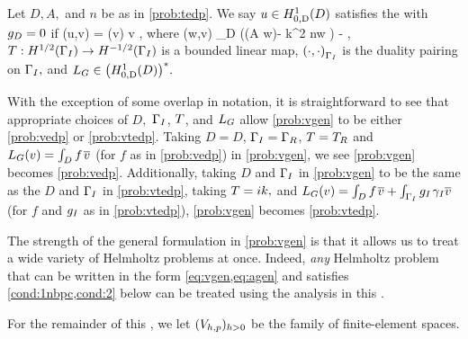\label{prob:vgen}
Let $D, A,$ and $n$ be as in \cref{prob:tedp}. We say $u \in \HozDD$ satisfies the  with $g_{D} = 0$ if
\beq\label{eq:vgen}
\aG(u,v) = \LG(v) \tfa v \in \HozDD,
\eeq
where
\beq\label{eq:agen}
\aG(w,v) \de \int_{D} \mleft(\mleft(A \grad w\mright)\cdot\grad \vbar - k^2 n\minispace w \vbar\mright) - ,
\eeq
$\T:\HhGI\rightarrow \HmhGI$ is a bounded linear map,  $\DPGI{\cdot}{\cdot}$ is the duality pairing on $\Gamma_{I},$ and $\LG  \in \HozDDs.$
\eprob

With the exception of some overlap in notation, it is straightforward to see that appropriate choices of $D,$ $\Gamma_{I}$, $T$, and $L_{G}$ allow \cref{prob:vgen} to be either \cref{prob:vedp} or \cref{prob:vtedp}. Taking $D = D$, $\Gamma_{I} = \Gamma_{R}$, $T = T_{R}$ and $L_{G}(v) = \int_{D} f\;\!\overline{v}$ (for $f$ as in \cref{prob:vedp}) in \cref{prob:vgen}, we see \cref{prob:vgen} becomes \cref{prob:vedp}. Additionally, taking $D$ and $\Gamma_{I}$ in \cref{prob:vgen} to be the same as the $D$ and $\Gamma_{I}$ in \cref{prob:vtedp}, taking $T=ik,$ and $L_{G}(v) = \int_{D} f\;\!\overline{v} + \int_{\Gamma_{I}} g_{I} \;\!\gamma_{I} \overline{v}$ (for $f$ and $g_{I}$ as in \cref{prob:vtedp}), \cref{prob:vgen} becomes \cref{prob:vtedp}.
\ere

The strength of the general formulation in \cref{prob:vgen} is that it allows us to treat a wide variety of Helmholtz problems at once. Indeed, \emph{any} Helmholtz problem that can be written in the form \cref{eq:vgen,eq:agen} and satisfies \cref{cond:1nbpc,cond:2} below can be treated using the analysis in this .
\ere 

For the remainder of this , we let $(V_{h,p})_{h>0}$ be the family of finite-element spaces.

